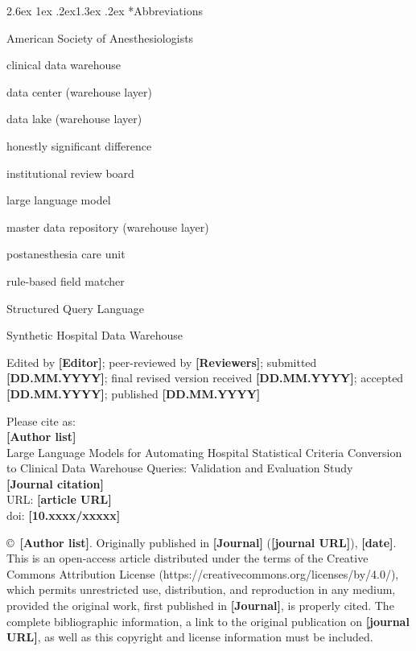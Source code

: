 \documentclass[10pt,twocolumn]{article}
\makeatletter
\renewcommand\section{\@startsection{section}{1}{\z@}%
  {2.6ex \@plus 1ex \@minus .2ex}{1.3ex \@plus .2ex}%
  {\normalfont\large\bfseries}}
\newcommand{\PH}[1]{{\color{red}\textbf{[#1]}}}
\makeatother
\begin{document}
\section*{Abbreviations}
{\footnotesize
\begin{description}[labelindent=1.4em,leftmargin=*,labelsep=0.45em,
                    itemsep=0pt,topsep=2pt,parsep=0pt]
  \item[ASA:] American Society of Anesthesiologists
  \item[CDW:] clinical data warehouse
  \item[DC:] data center (warehouse layer)
  \item[DL:] data lake (warehouse layer)
  \item[HSD:] honestly significant difference
  \item[IRB:] institutional review board
  \item[LLM:] large language model
  \item[MDR:] master data repository (warehouse layer)
  \item[PACU:] postanesthesia care unit
  \item[RBFM:] rule-based field matcher
  \item[SQL:] Structured Query Language
  \item[SynHDW:] Synthetic Hospital Data Warehouse
\end{description}}

\vspace{10pt}
{\footnotesize\noindent
Edited by \PH{Editor}; peer-reviewed by \PH{Reviewers}; submitted \PH{DD.MM.YYYY};
final revised version received \PH{DD.MM.YYYY}; accepted \PH{DD.MM.YYYY};
published \PH{DD.MM.YYYY}

\vspace{6pt}\noindent
Please cite as:\\
\PH{Author list}\\
Large Language Models for Automating Hospital Statistical Criteria Conversion to
Clinical Data Warehouse Queries: Validation and Evaluation Study\\
\PH{Journal citation}\\
URL: \PH{article URL}\\
doi: \PH{10.xxxx/xxxxx}

\vspace{6pt}\noindent
\copyright\ \PH{Author list}. Originally published in \PH{Journal}
(\PH{journal URL}), \PH{date}. This is an open-access article distributed under
the terms of the Creative Commons Attribution License
(https://creativecommons.org/licenses/by/4.0/), which permits unrestricted use,
distribution, and reproduction in any medium, provided the original work, first
published in \PH{Journal}, is properly cited. The complete bibliographic
information, a link to the original publication on \PH{journal URL}, as well as
this copyright and license information must be included.\par}
\end{document}
